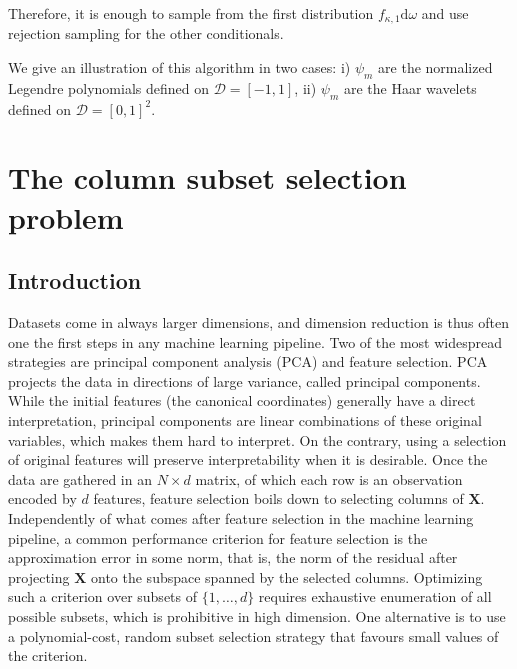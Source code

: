 \documentclass[twoside,11pt]{book}
\numberwithin{theorem}{chapter}
\numberwithin{definition}{chapter}
\numberwithin{proposition}{chapter}
\numberwithin{corollary}{chapter}
\numberwithin{example}{chapter}
\numberwithin{lemma}{chapter}
\numberwithin{assumption}{chapter}
\begin{document}
Therefore, it is enough to sample from the first distribution $f_{\kappa,1} \mathrm{d}\omega$ and use rejection sampling for the other conditionals.

We give an illustration of this algorithm in two cases: i) $\psi_{m}$ are the normalized Legendre polynomials defined on $\mathcal{D}= [-1,1]$, ii) $\psi_m$ are the Haar wavelets defined on $\mathcal{D}= [0,1]^{2}$.






\chapter{The column subset selection problem}\label{chapter:cssp}
\section{Introduction}



Datasets come in always larger dimensions, and dimension reduction is thus often one the first steps in any machine learning pipeline. Two of the most widespread strategies are principal component analysis (PCA) and feature selection. PCA projects the data in directions of large variance, called principal components. While the initial features (the canonical coordinates) generally have a direct interpretation, principal components are linear combinations of these original variables, which makes them hard to interpret. On the contrary, using a selection of original features will preserve interpretability when it is desirable. Once the data are gathered in an $N\times d$ matrix, of which each row is an observation encoded by $d$ features, feature selection boils down to selecting columns of $\bm{X}$. Independently of what comes after feature selection in the machine learning pipeline, a common performance criterion for feature selection is the approximation error in some norm, that is, the norm of the residual after projecting $\bm{X}$ onto the subspace spanned by the selected columns. Optimizing such a criterion over subsets of $\{1,\dots,d\}$ requires exhaustive enumeration of all possible subsets, which is prohibitive in high dimension. One alternative is to use a polynomial-cost, random subset selection strategy that favours small values of the criterion.
%
\end{document}
